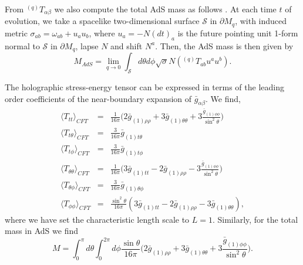\documentclass[a4paper,11pt]{article}
\numberwithin{equation}{section}
\begin{document}
From $^{(q)}T_{\alpha\beta}$ we also compute the total AdS mass as follows \cite{Balasubramanian:1999re}. At each time $t$ of evolution, we take a spacelike two-dimensional surface $\mathcal{S}$ in $\partial M_q$, with induced metric $\sigma_{ab}=\omega_{ab}+u_a u_b$, where $u_a=-N(dt)_a$ is the future pointing unit 1-form normal to $\mathcal{S}$ in $\partial M_q$, lapse $N$ and shift $N^a$. Then, the AdS mass is then given by
\begin{equation}
M_{AdS}=\lim_{q\to0}\int_{\mathcal{S}} d\theta d\phi \sqrt{\sigma} N ( ^{(q)}T_{ab} u^a u^b).
\end{equation}

The holographic stress-energy tensor can be expressed in terms of the leading order coefficients of the near-boundary expansion of $\bar{g}_{\alpha\beta}$. We find,
\begin{eqnarray}
\label{eq:set_explicit}
\langle T_{tt}\rangle_{CFT}&=&\frac{1}{16\pi} \biggl(2\bar{g}_{(1)\rho\rho}+3\bar{g}_{(1)\theta\theta}+3\frac{\bar{g}_{(1)\phi\phi}}{\sin^2\theta}\biggr) \nonumber \\
\langle T_{t\theta}\rangle_{CFT}&=&\frac{3}{16\pi}\bar{g}_{(1)t\theta} \nonumber \\
\langle T_{t\phi}\rangle_{CFT}&=&\frac{3}{16\pi}\bar{g}_{(1)t\phi} \nonumber \\
\langle T_{\theta\theta}\rangle_{CFT}&=&\frac{1}{16\pi} \biggl(3\bar{g}_{(1)tt}-2\bar{g}_{(1)\rho\rho}-3\frac{\bar{g}_{(1)\phi\phi}}{\sin^2\theta}\biggr) \nonumber \\
\langle T_{\theta\phi}\rangle_{CFT}&=&\frac{3}{16\pi}\bar{g}_{(1)\theta\phi} \nonumber \\
\langle T_{\phi\phi}\rangle_{CFT}&=&\frac{\sin^2\theta}{16\pi} (3\bar{g}_{(1)tt}-2\bar{g}_{(1)\rho\rho}-3\bar{g}_{(1)\theta\theta}),
\end{eqnarray}
where we have set the characteristic length scale to $L=1$. 
Similarly, for the total mass in AdS we find
\begin{equation}
\label{eq:AdSmasscalc}
M=\int_0^\pi d\theta \int_0^{2\pi}d\phi\frac{\sin\theta}{16\pi} \biggl(2\bar{g}_{(1)\rho\rho}+3\bar{g}_{(1)\theta\theta}+3\frac{\bar{g}_{(1)\phi\phi}}{\sin^2\theta}\biggr).
\end{equation}
\end{document}
